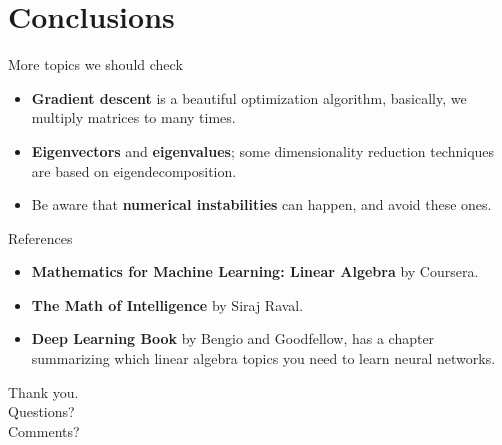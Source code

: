 \documentclass[handout]{beamer}
\begin{document}
\section{Conclusions}

\begin{frame}{More topics we should check}
    \begin{itemize}
        \item \textbf{Gradient descent} is a beautiful optimization algorithm,
                basically, we multiply matrices to many times.
        \item \textbf{Eigenvectors} and \textbf{eigenvalues}; some
                dimensionality reduction techniques are based on eigendecomposition.
        \item Be aware that \textbf{numerical instabilities} can happen, and avoid these ones.
    \end{itemize} 
\end{frame}

\begin{frame}{References}
    \begin{itemize}
        \item \textbf{Mathematics for Machine Learning: Linear Algebra} by Coursera.
        \item \textbf{The Math of Intelligence} by Siraj Raval.
        \item \textbf{Deep Learning Book} by Bengio and Goodfellow, has a chapter summarizing
            which linear algebra topics you need to learn neural networks.
    \end{itemize}
\end{frame}

\begin{frame}
\huge{Thank you.}\\
\huge{Questions?}\\
\huge{Comments?}\\
\end{frame}
\end{document}

